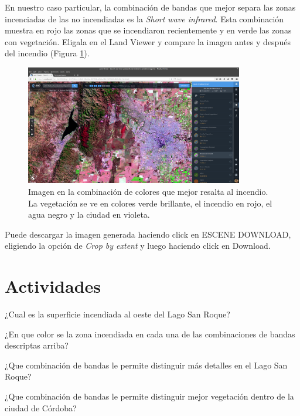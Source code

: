\documentclass[a4paper,12pt]{book}
\begin{document}
En nuestro caso particular, la combinación de bandas que mejor separa las zonas incenciadas de las no incendiadas es la \emph{Short wave infrared}. Esta combinación muestra en rojo las zonas que se incendiaron recientemente y en verde las zonas con vegetación. Eligala en el Land Viewer y compare la imagen antes y después del incendio (Figura \ref{fig:incendio}).

\begin{figure}[h!]
    \centering
    \includegraphics[width=0.85\textwidth]{fig:incendio.png}
    \caption{Imagen en la combinación de colores que mejor resalta al incendio. La vegetación se ve en colores verde brillante, el incendio en rojo, el agua negro y la ciudad en violeta.}
    \label{fig:incendio}
\end{figure}

Puede descargar la imagen generada haciendo click en ESCENE DOWNLOAD, eligiendo la opción de \emph{Crop by extent} y luego haciendo click en Download.

\section{Actividades}

\begin{que}
    ¿Cual es la superficie incendiada al oeste del Lago San Roque?
\end{que}

\begin{que}
    ¿En que color se la zona incendiada en cada una de las combinaciones de bandas descriptas arriba?
\end{que}

\begin{que}
    ¿Que combinación de bandas le permite distinguir más detalles en el Lago San Roque?
\end{que}

\begin{que}
    ¿Que combinación de bandas le permite distinguir mejor vegetación dentro de la ciudad de Córdoba?
\end{que}
\end{document}
